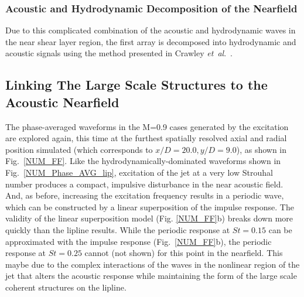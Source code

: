 \documentclass[english]{aiaa-tc}
\newcommand*{\etal}{\textit{et~al}.\ }
\begin{document}
\subsubsection{Acoustic and Hydrodynamic Decomposition of the Nearfield}
Due to this complicated combination of the acoustic and hydrodynamic waves in the near shear layer region, the first array is decomposed into hydrodynamic and acoustic signals using the method presented in Crawley \etal \cite{Crawley2014}.

\subsection{Linking The Large Scale Structures to the Acoustic Nearfield}
The phase-averaged waveforms in the M=0.9 cases generated by the excitation are explored again, this time at the furthest spatially resolved axial and radial position simulated (which corresponds to $x/D = 20.0, y/D = 9.0$), as shown in Fig.~\ref{NUM_FF}.
Like the hydrodynamically-dominated waveforms shown in Fig.~\ref{NUM_Phase_AVG_lip}, excitation of the jet at a very low Strouhal number produces a compact, impulsive disturbance in the near acoustic field.
And, as before, increasing the excitation frequency results in a periodic wave, which can be constructed by a linear superposition of the impulse response.
The validity of the linear superposition model (Fig. \ref{NUM_FF}b) breaks down more quickly than the lipline results.
While the periodic response at $St = 0.15$ can be approximated with the impulse response (Fig.~\ref{NUM_FF}b), the periodic response at $St = 0.25$ cannot (not shown) for this point in the nearfield. This maybe due to the complex interactions of the waves in the nonlinear region of the jet that alters the acoustic response while maintaining the form of the large scale coherent structures on the lipline.
\end{document}
